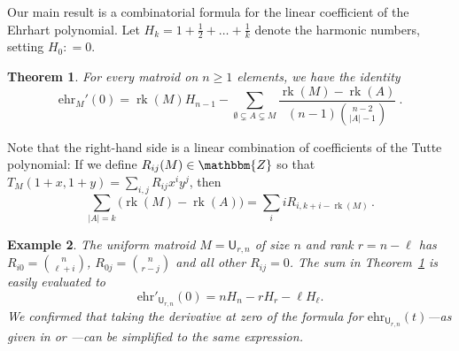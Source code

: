 \documentclass[pagesize,paper=A4,11pt,bibliography=totoc,oneside]{scrartcl}
\newtheorem{thm}{Theorem}
\newtheorem{example}[thm]{Example}
\newcommand{\ZZ}{\mathbbm{Z}}
\newcommand{\defas}{\mathrel{\mathop:}=}
\newcommand{\abs}[1]{\left|#1\right|}
\newcommand{\td}[1][]{\mathrm{d}^{#1}} %
\DeclareMathOperator{\rk}{rk}
\newcommand{\UM}[2]{\mathsf{U}_{#2,#1}} %
\newcommand{\ehr}{\mathrm{ehr}}
\newcommand{\Tutte}{T}
\newcommand{\HN}{H} %
\begin{document}
Our main result is a combinatorial formula for the linear coefficient of the Ehrhart polynomial. Let $\HN_k=1+\frac{1}{2}+\ldots+\frac{1}{k}$ denote the harmonic numbers, setting $H_0\defas 0$.
\begin{thm}\label{thm:Dehr0}
    For every matroid on $n\geq1$ elements, we have the identity
    \begin{equation}\label{eq:ehr0-binom}
        \ehr_M'(0)
        = \rk(M) \HN_{n-1}-\sum_{\emptyset \subsetneq A \subsetneq M} \frac{\rk(M)-\rk(A)}{(n-1)\binom{n-2}{\abs{A}-1}}
        \ .
    \end{equation}
\end{thm}
Note that the right-hand side is a linear combination of coefficients of the Tutte polynomial: If we define $R_{ij}(M)\in\ZZ$ so that $\Tutte_M(1+x,1+y)=\sum_{i,j} R_{ij} x^i y^j$, then
\begin{equation*}
    \sum_{\abs{A}=k} \big(\rk(M)-\rk(A)\big)=\sum_{i} i R_{i,k+i-\rk(M)}\,.
\end{equation*}\vspace{-5mm}
\begin{example}\label{ex:ehr0-UM}
    The uniform matroid $M=\UM{n}{r}$ of size $n$ and rank $r=n-\ell$ has $R_{i0}=\binom{n}{\ell+i}$, $R_{0j}=\binom{n}{r-j}$ and all other $R_{ij}=0$. The sum in Theorem~\ref{thm:Dehr0} is easily evaluated to
    \begin{equation*}
        \ehr'_{\UM{n}{r}}(0) 
        =n\HN_n-r\HN_r-\ell \HN_\ell
        .
    \end{equation*}
    We confirmed that taking the derivative at zero of the formula for $\ehr_{\UM{n}{r}}(t)$---as given in \cite[Corollary~2.2]{Katzman:HilbertVeronese} or \cite[Theorem~2.1]{Ferroni:HyperPositive}---can be simplified to the same expression.
\end{example}
\end{document}
